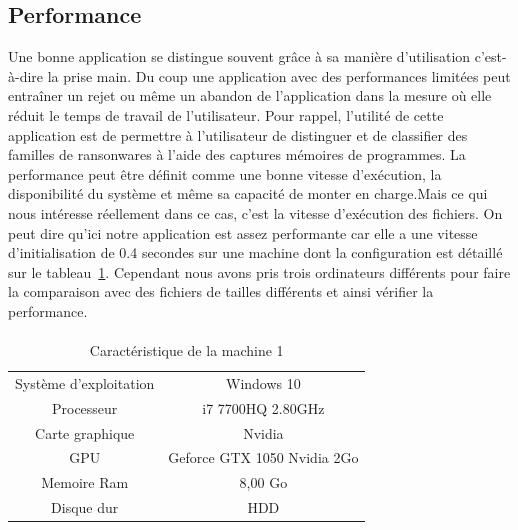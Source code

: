 \documentclass[a4paper, 12pt]{book}
\begin{document}
\subsection{Performance}
Une bonne application se distingue souvent grâce à sa manière d’utilisation c’est-à-dire la prise main.
Du coup une application avec des performances limitées peut entraîner un rejet ou même un abandon de l’application dans la mesure où elle réduit le temps de travail de l’utilisateur.
\newline
Pour rappel, l'utilité de cette application est de permettre à l'utilisateur de distinguer et de classifier des familles de ransonwares à l'aide des captures mémoires de programmes.
\newline
La performance peut être définit comme une bonne vitesse d’exécution, la disponibilité du système et même sa capacité de monter en charge.Mais ce qui nous intéresse réellement dans ce cas, c’est la vitesse d’exécution des fichiers.
On peut dire qu’ici notre application est assez performante car elle a une vitesse d'initialisation de 0.4 secondes sur une machine dont la configuration est détaillé sur le tableau~\ref{machine1}.
Cependant nous avons pris trois ordinateurs différents pour faire la comparaison avec des fichiers de tailles différents et ainsi vérifier la performance.

\paragraph{}

\begin{table}[h]
  \centering
\begin{tabular}{|c|c|}
    \hline
    \rowcolor{gray}
   \multicolumn{2}{|c|}{Machine 1}\\
    \hline 
       Système d'exploitation &Windows 10\\
    \hline 
       Processeur&i7 7700HQ 2.80GHz\\
       \hline 
       Carte graphique&Nvidia\\
       
    \hline
       GPU&Geforce GTX 1050 Nvidia 2Go\\
    
    \hline 
       Memoire Ram&8,00 Go\\
    \hline
      Disque dur&HDD\\
    \hline
\end{tabular}\\
\caption{Caractéristique de la machine 1}
\label{machine1}
\end{table}
\end{document}
